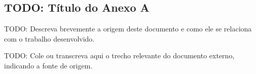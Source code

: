 %
%
%

\begin{anexosenv}

\partanexos


\chapter{TODO: Título do Anexo A}
\label{anx:doc-externo}

TODO: Descreva brevemente a origem deste documento e como ele se
relaciona com o trabalho desenvolvido.

TODO: Cole ou transcreva aqui o trecho relevante do documento externo,
indicando a fonte de origem.

% 


%


\end{anexosenv}
